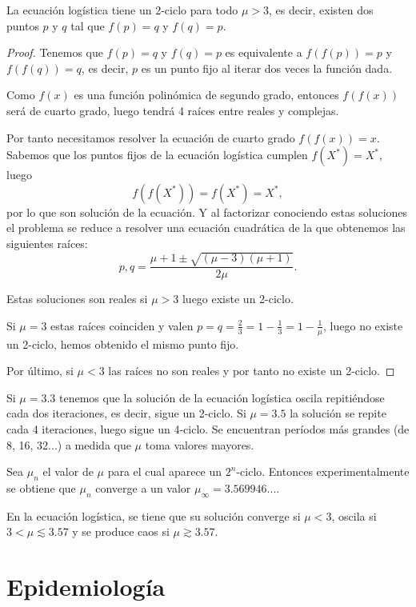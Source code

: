 \begin{proposition}
La ecuación logística tiene un 2-ciclo para todo $\mu > 3$, es decir, existen dos puntos $p$ y $q$ tal que $f(p)=q$ y $f(q)=p$.
\end{proposition}

\begin{proof}
Tenemos que $f(p)=q$ y $f(q)=p$ es equivalente a $f(f(p))=p$ y $f(f(q))=q$, es decir, $p$ es un punto fijo al iterar dos veces la función dada.

Como $f(x)$ es una función polinómica de segundo grado, entonces $f(f(x))$ será de cuarto grado, luego tendrá 4 raíces entre reales y complejas.

Por tanto necesitamos resolver la ecuación de cuarto grado $f(f(x))=x$. Sabemos que los puntos fijos de la ecuación logística cumplen $f(X^*)=X^*$, luego
$$f(f(X^*))=f(X^*)=X^*,$$
por lo que son solución de la ecuación. Y al factorizar conociendo estas soluciones el problema se reduce a resolver una ecuación cuadrática de la que obtenemos las siguientes raíces:
$$p,q=\frac{\mu+1\pm \sqrt{(\mu -3)(\mu +1)}}{2\mu}.$$

Estas soluciones son reales si $\mu > 3$ luego existe un 2-ciclo.

Si $\mu = 3$ estas raíces coinciden y valen $p=q=\frac{2}{3}=1-\frac{1}{3}=1-\frac{1}{\mu }$, luego no existe un 2-ciclo, hemos obtenido el mismo punto fijo.

Por último, si $\mu < 3$ las raíces no son reales y por tanto no existe un 2-ciclo.
\end{proof}

Si $\mu = 3.3$ tenemos  que la solución de la ecuación logística oscila repitiéndose cada dos iteraciones, es decir, sigue un 2-ciclo. Si $\mu = 3.5$ la solución se repite cada 4 iteraciones, luego sigue un 4-ciclo.
Se encuentran períodos más grandes (de 8, 16, 32...) a medida que $\mu$ toma valores mayores.

Sea $\mu_n$ el valor de $\mu$ para el cual aparece un $2^n$-ciclo. Entonces experimentalmente se obtiene que $\mu_n$ converge a un valor $\mu_\infty=3.569946...$.


\begin{proposition}
En la ecuación logística, se tiene que su solución converge si $\mu < 3$, oscila si $3 < \mu \lesssim 3.57$ y se produce caos si $\mu \gtrsim 3.57$. 
\end{proposition}


\section{Epidemiología}

